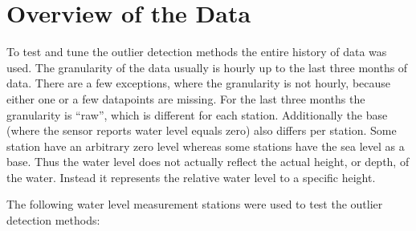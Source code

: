 \section{Overview of the Data}
To test and tune the outlier detection methods the entire history of data was used. The granularity of the data usually is hourly up to the last three months of data. There are a few exceptions, where the granularity is not hourly, because either one or a few datapoints are missing. For the last three months the granularity is ``raw'', which is different for each station. Additionally the base (where the sensor reports water level equals zero) also differs per station. Some station have an arbitrary zero level whereas some stations have the sea level as a base. Thus the water level does not actually reflect the actual height, or depth, of the water. Instead it represents the relative water level to a specific height.
\par
The following water level measurement stations were used to test the outlier detection methods:
